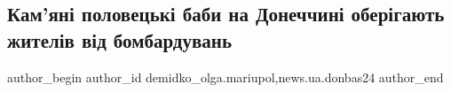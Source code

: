  
 
 
 
 
 
\subsection{Кам'яні половецькі баби на Донеччині оберігають жителів від бомбардувань}
\label{sec:29_06_2022.stz.news.ua.donbas24.1.kamjani_polovecki_baby_oberigajut_vid_bombarduvanj}
 
\ifcmt
 author_begin
   author_id demidko_olga.mariupol,news.ua.donbas24
 author_end
\fi
